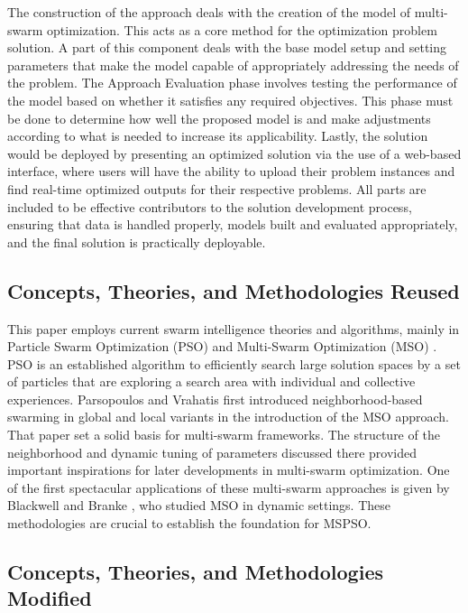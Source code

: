 \documentclass{article}
\begin{document}
The construction of the approach deals with the creation of the model of multi-swarm optimization. This acts as a core method for the optimization problem solution. A part of this component deals with the base model setup and setting parameters that make the model capable of appropriately addressing the needs of the problem. The Approach Evaluation phase involves testing the performance of the model based on whether it satisfies any required objectives. This phase must be done to determine how well the proposed model is and make adjustments according to what is needed to increase its applicability. Lastly, the solution would be deployed by presenting an optimized solution via the use of a web-based interface, where users will have the ability to upload their problem instances and find real-time optimized outputs for their respective problems. All parts are included to be effective contributors to the solution development process, ensuring that data is handled properly, models built and evaluated appropriately, and the final solution is practically deployable. 

\subsection{Concepts, Theories, and Methodologies Reused}

This paper employs current swarm intelligence theories and algorithms, mainly in Particle Swarm Optimization (PSO) \cite{kennedy1995particle} and Multi-Swarm Optimization (MSO) \cite{blackwell2004multi}. PSO is an established algorithm to efficiently search large solution spaces by a set of particles that are exploring a search area with individual and collective experiences. Parsopoulos and Vrahatis \cite{parsopoulos2002recent} first introduced neighborhood-based swarming in global and local variants in the introduction of the MSO approach. That paper set a solid basis for multi-swarm frameworks. The structure of the neighborhood and dynamic tuning of parameters discussed there provided important inspirations for later developments in multi-swarm optimization. One of the first spectacular applications of these multi-swarm approaches is given by Blackwell and Branke \cite{blackwell2004multi}, who studied MSO in dynamic settings. These methodologies are crucial to establish the foundation for MSPSO.

\subsection{Concepts, Theories, and Methodologies Modified}
\end{document}
